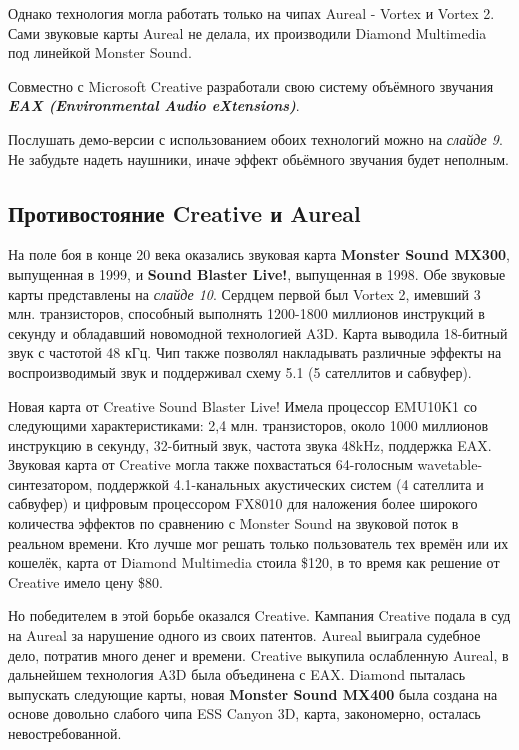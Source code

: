 \documentclass[a4paper,12pt]{extarticle}
\begin{document}
	Однако технология могла работать только на чипах Aureal - Vortex и Vortex 2. Сами звуковые карты Aureal не делала, их производили Diamond Multimedia под линейкой Monster Sound. 
	
	Совместно с Microsoft Creative разработали свою систему объёмного звучания \textbf{\textit{EAX (Environmental Audio eXtensions)}}.
	
	Послушать демо-версии с использованием обоих технологий можно на \textit{слайде 9}. Не забудьте надеть наушники, иначе эффект обьёмного звучания будет неполным.
	
	\subsection{Противостояние Creative и Aureal}
	На поле боя в конце 20 века оказались звуковая карта \textbf{Monster Sound MX300}, выпущенная в 1999, и \textbf{Sound Blaster Live!}, выпущенная в 1998. Обе звуковые карты представлены на \textit{слайде 10}. Сердцем первой был Vortex 2, имевший 3 млн. транзисторов, способный выполнять 1200-1800 миллионов инструкций в секунду и обладавший новомодной технологией A3D. Карта выводила 18-битный звук с частотой 48 кГц. Чип также позволял накладывать различные эффекты на воспроизводимый звук и поддерживал схему 5.1 (5 сателлитов и сабвуфер).
	
	Новая карта от Creative Sound Blaster Live! Имела процессор EMU10K1 со следующими характеристиками: 2,4 млн. транзисторов, около 1000 миллионов инструкцию в секунду, 32-битный звук, частота звука 48kHz, поддержка EAX. Звуковая карта от Creative могла также похвастаться 64-голосным wavetable-синтезатором, поддержкой 4.1-канальных акустических систем (4 сателлита и сабвуфер) и цифровым процессором FX8010 для наложения более широкого количества эффектов по сравнению с Monster Sound на звуковой поток в реальном времени. Кто лучше мог решать только пользователь тех времён или их кошелёк, карта от Diamond Multimedia стоила \$120, в то время как решение от Creative имело цену \$80.
	
	Но победителем в этой борьбе оказался Creative. Кампания Creative подала в суд на Aureal за нарушение одного из своих патентов. Aureal выиграла судебное дело, потратив много денег и времени. Creative выкупила ослабленную Aureal, в дальнейшем технология A3D была объединена с EAX. Diamond пыталась выпускать следующие карты, новая \textbf{Monster Sound MX400} была создана на основе довольно слабого чипа ESS Canyon 3D, карта, закономерно, осталась невостребованной.
	
\end{document}
